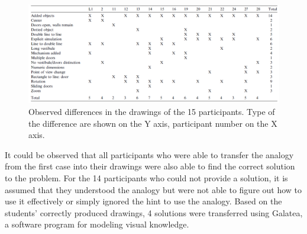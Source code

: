 \documentclass[12pt]{article}
\begin{document}
\begin{figure}[H]
  \centering
  \includegraphics[width=\linewidth]{images/table_differences_of_solutions.PNG}
  \caption{\label{fig:summary_differences}Observed differences in the drawings of the 15 participants. Type of the difference are shown on the Y axis, participant number on the X axis. \protect\cite[p. 209]{davies2009computational}
}
  
\end{figure}     

It could be observed that all participants who were able to transfer the analogy from the first case into their drawings were also able to find the correct solution to the problem. For the 14 participants who could not provide a solution, it is assumed that they understood the analogy but were not able to figure out how to use it effectively or simply ignored the hint to use the analogy. Based on the students' correctly produced drawings, 4 solutions were transferred using Galatea, a software program for modeling visual knowledge. 
\end{document}
